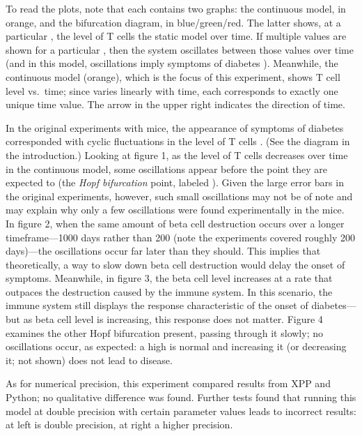 To read the plots, note that each contains two graphs: the continuous model,
in orange, and the bifurcation diagram, in blue/green/red. The latter shows,
at a particular , the level of T cells the static model
 over time. If multiple values are shown for a
particular , then the system oscillates between those values
over time (and in this model, oscillations imply symptoms of diabetes
\cite{Mahaffy2007}). Meanwhile, the continuous model (orange), which is the
focus of this experiment, shows T cell level vs.\ time; since
 varies linearly with time, each  corresponds
to exactly one unique time value. The arrow in the upper right indicates the
direction of time.

In the original experiments with mice, the appearance of symptoms of
diabetes corresponded with cyclic fluctuations in the level of T cells
\cite{Trudeau2003}. (See the diagram in the introduction.)  Looking at
figure 1, as the level of T cells decreases over time in the continuous
model, some oscillations appear before the point they are expected to (the
{\em Hopf bifurcation} point, labeled ). Given the large error
bars in the original experiments, however, such small oscillations may not
be of note and may explain why only a few oscillations were found
experimentally in the mice. In figure 2, when the same amount of beta cell
destruction occurs over a longer timeframe—1000 days rather than 200 (note
the experiments covered roughly 200 days)—the oscillations occur far later
than they should. This implies that theoretically, a way to slow down beta
cell destruction would delay the onset of symptoms. Meanwhile, in figure 3,
the beta cell level increases at a rate that outpaces the destruction caused
by the immune system. In this scenario, the immune system still displays the
response characteristic of the onset of diabetes—but as beta cell level is
increasing, this response does not matter. Figure 4 examines the other Hopf
bifurcation present, passing through it slowly; no oscillations occur, as
expected: a high  is normal \cite{Mahaffy2007} and increasing
it (or decreasing it; not shown) does not lead to disease.


As for numerical precision, this experiment compared results from XPP and
Python; no qualitative difference was found. Further tests found that
running this model at double precision with certain parameter values leads
to incorrect results: at left is double precision, at right a higher
precision.
